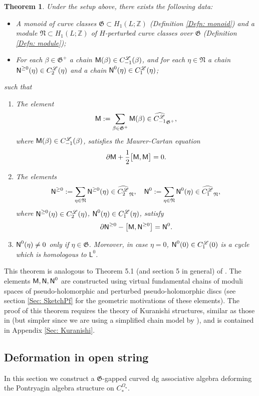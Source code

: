 \documentclass[10pt]{amsart}
\numberwithin{equation}{section}
\theoremstyle{plain}
\newtheorem{theorem}{Theorem}[section]
\theoremstyle{definition}
\theoremstyle{remark}
\numberwithin{equation}{section}
\newcommand{\Z}{\mathbb{Z}}
\newcommand{\wh}[1]{\widehat{#1}}
\newcommand{\mf}[1]{\mathfrak{#1}}
\newcommand{\CBa}{C_*^{\Omega_\star}}
\newcommand{\Cfr}[1]{C_{#1}^\mathscr{L}}
\newcommand{\MM}{\textup{\textsf{M}}}
\newcommand{\NN}{\textup{\textsf{N}}}
\newcommand{\LL}{\textsf{L}}
\begin{document}
{\bigskip
\begin{theorem}\label{Thm: VFCmain}
	Under the setup above, there exists the following data:
	\begin{itemize}
	\item A monoid of curve classes $\mathfrak{G}\subset H_1(L;\Z)$ (Definition \ref{Defn: monoid})  and a module $\mathfrak{N}\subset H_1(L;\Z)$ of $H$-perturbed curve classes over $\mathfrak{G}$ (Definition \ref{Defn: module});
	\item For each $\beta\in\mathfrak{G}^+$ a chain $\MM(\beta)\in \Cfr{-1}(\beta)$, and for each $\eta\in \mathfrak{N}$ a chain $\NN^{\geq 0}(\eta)\in \Cfr{2}(\eta)$ and a chain $\NN^0(\eta)\in \Cfr{1}(\eta)$;
\end{itemize}
	such that 
	\begin{enumerate}
		\item The element \[\MM := \sum_{\beta\in\mathfrak{G}^+} \MM(\beta) \in \wh{\Cfr{-1}}_{\mathfrak{G}^+}, \]where $\MM(\beta)\in \Cfr{-1}(\beta)$,
	satisfies the Maurer-Cartan equation  \[ \partial \MM + \frac{1}{2} \big[\MM,\MM\big]  = 0. \]
		\item The elements \[\NN^{\geq 0} := \sum_{\eta\in\mathfrak{N}} \NN^{\geq 0}(\eta) \in \wh{\Cfr{2}}_\mathfrak{N},\quad 
	\NN^{ 0} := \sum_{\eta\in\mathfrak{N}} \NN^{ 0}(\eta)\in \wh{\Cfr{1}}_\mathfrak{N}, \]where $\NN^{\geq 0}(\eta)\in \Cfr{2}(\eta)$, $\NN^0(\eta) \in \Cfr{1}(\eta)$,
	satisfy \[ \partial  \NN^{\geq 0}- \big[\MM, \NN^{\geq 0}\big] = \NN^{0}.   \]
	\item $\NN^0(\eta)\neq 0$ only if $\eta \in \mf{G}$. Moreover, in case $\eta = 0$, $\NN^0(0) \in \Cfr{1}(0)$ is a cycle which is homologous  to $\LL^0$. 
	\end{enumerate}
\end{theorem}

This theorem is analogous to Theorem 5.1 (and section 5 in general) of \cite{Irie2}. The elements $\MM, \NN, \NN^0$ are constructed using virtual fundamental chains of moduli spaces of pseudo-holomorphic and perturbed pseudo-holomorphic discs (see section \ref{Sec: SketchPf} for the geometric motivations of these elements). 
The  proof of this theorem requires the theory of Kuranishi structures, similar as those in \cite{Irie2} (but simpler since we are using a simplified chain model by \cite{WangThesis}), and is contained in Appendix \ref{Sec: Kuranishi}.






\subsection{Deformation in open string}\label{Subsc: Ainfty}
In this section we construct a $\mf{G}$-gapped curved dg associative algebra deforming the Pontryagin algebra structure on $\CBa$.

}
\end{document}
